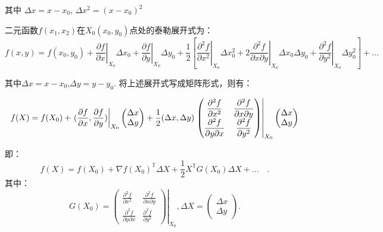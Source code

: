 其中 $\Delta x = x - x_0$, $\Delta x^2 = (x - x_0)^2$

二元函数$f(x_1,x_2)$在$X_0(x_0,y_0)$点处的泰勒展开式为：
\begin{equation}
    f(x,y) = f(x_0,y_0)
        + \left.\displaystyle\frac{\partial f}{\partial x}\right|_{X_0}\Delta x_0    
        + \left.\displaystyle\frac{\partial f}{\partial y}\right|_{X_0}\Delta y_0    
        + \frac{1}{2}
        \left[ \left.\displaystyle\frac{\partial^2f}{\partial x^2}\right|_{X_0}\Delta x_0^2 + 
          2\left.\displaystyle\frac{\partial^2f}{\partial x\partial y}\right|_{X_0}\Delta x_0\Delta y_0 + 
          \left.\displaystyle\frac{\partial^2f}{\partial y^2}\right|_{X_0}\Delta y_0^2 \right]   
        + ...
\end{equation}

其中$\Delta x = x - x_0$,$\Delta y = y - y_0$.
将上述展开式写成矩阵形式，则有：

\begin{equation}
    f(X) = f(X_0) 
    + \left.( \displaystyle\frac{\partial f}{\partial x},
        \displaystyle\frac{\partial f}{\partial y} )\right|_{X_0}    
        \begin{pmatrix}
             \Delta x \\
             \Delta y
        \end{pmatrix}
    +\newline \frac{1}{2}(\Delta x, \Delta y)
        \left.
        \begin{pmatrix}
            \displaystyle\frac{\partial^2f}{\partial x^2} & \displaystyle\frac{\partial^2f}{\partial x\partial y} \\
            \displaystyle\frac{\partial^2f}{\partial y\partial x} & \displaystyle\frac{\partial^2f}{\partial y^2}
        \end{pmatrix}
        \right|_{X_0}
        \begin{pmatrix}
             \Delta x \\
             \Delta y
        \end{pmatrix}
\end{equation}

即：
\begin{equation}
    f(X) = f(X_0) + \nabla f(X_0)^{\mathbb{T}}\Delta X + \frac{1}{2}X^{\mathbb{T}}G(X_0)\Delta X + ...\quad.
\end{equation}
其中：
\begin{equation}
    G(X_0) = 
        \left.
        \begin{pmatrix}
            \displaystyle\frac{\partial^2f}{\partial x^2} & \displaystyle\frac{\partial^2f}{\partial x\partial y} \\
            \displaystyle\frac{\partial^2f}{\partial y\partial x} & \displaystyle\frac{\partial^2f}{\partial y^2}
        \end{pmatrix}
        \right|_{X_0},
    \Delta X = 
        \begin{pmatrix}
             \Delta x \\
             \Delta y
        \end{pmatrix}.
\end{equation}


